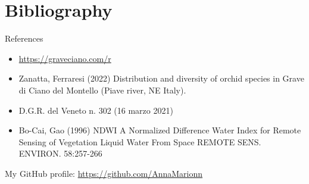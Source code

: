 \documentclass{beamer}
\begin{document}
\section{Bibliography}

\begin{frame}{References}
  \begin{itemize}
    \item \url{https://graveciano.com/r}  
    \item Zanatta, Ferraresi (2022) Distribution and diversity of orchid species in Grave di Ciano del Montello (Piave river, NE Italy).
    \item D.G.R. del Veneto n. 302 (16 marzo 2021)
    \item Bo-Cai, Gao (1996) NDWI A Normalized Difference Water Index for Remote Sensing of Vegetation Liquid Water From Space REMOTE SENS. ENVIRON. 58:257-266 
    \end{itemize}
\end{frame}

\begin{frame}
\centering
{}

My GitHub profile: \url{https://github.com/AnnaMarionn}
\end{frame}
\end{document}
